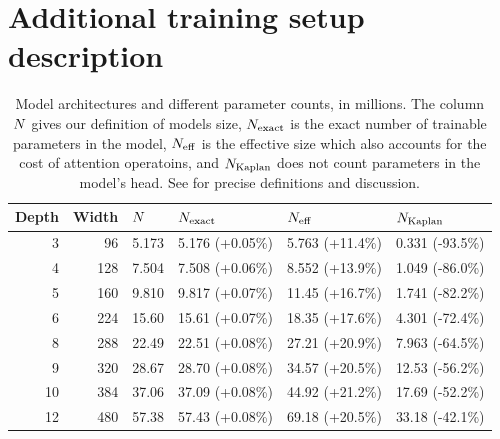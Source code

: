 \documentclass{article}
\theoremstyle{plain}
\theoremstyle{definition}
\theoremstyle{remark}
\newcommand{\maybeSubscript}[1]{
  \ifthenelse{\equal{#1}{}}{}{_{#1}}%
}
\newcommand{\params}[1][]{N\maybeSubscript{#1}}
\newcommand{\paramsEff}{\params_{\mathrm{eff}}}
\newcommand{\paramsKaplan}{\params_{\mathrm{Kaplan}}}
\newcommand{\paramsExact}{\params_{\mathrm{exact}}}
\begin{document}
\section{Additional training setup description}\label{app:training-setup}
\vspace{1em}
\begin{table}
    \caption{Model architectures and different parameter counts, in millions. The column $\params$ gives our definition of models size, $\paramsExact$ is the exact number of trainable parameters in the model, $\paramsEff$ is the effective size which also accounts for the cost of attention operatoins, and $\paramsKaplan$ does not count parameters in the model's head. See  for precise definitions and discussion.
    }
    \vspace{1em}
    \label{tab:model-archs}
    \centering
\renewcommand{\arraystretch}{1.15}
\begin{tabular}{rrllll}
\toprule
 Depth &  Width &     $\params$ &        $\paramsExact$ &           $\paramsEff$ &        $\paramsKaplan$ \\
\midrule
     \num{3} &     \num{96} & \num{5.173} & \num{5.176} \scriptsize{(+0.05\%)} & \num{5.763} \scriptsize{(+11.4\%)} & \num{0.331} \scriptsize{(-93.5\%)} \\
     \num{4} &    \num{128} & \num{7.504} & \num{7.508} \scriptsize{(+0.06\%)} & \num{8.552} \scriptsize{(+13.9\%)} & \num{1.049} \scriptsize{(-86.0\%)} \\
     \num{5} &    \num{160} & \num{9.810} & \num{9.817} \scriptsize{(+0.07\%)} & \num{11.45} \scriptsize{(+16.7\%)} & \num{1.741} \scriptsize{(-82.2\%)} \\
     \num{6} &    \num{224} & \num{15.60} & \num{15.61} \scriptsize{(+0.07\%)} & \num{18.35} \scriptsize{(+17.6\%)} & \num{4.301} \scriptsize{(-72.4\%)} \\
     \num{8} &    \num{288} & \num{22.49} & \num{22.51} \scriptsize{(+0.08\%)} & \num{27.21} \scriptsize{(+20.9\%)} & \num{7.963} \scriptsize{(-64.5\%)} \\
     \num{9} &    \num{320} & \num{28.67} & \num{28.70} \scriptsize{(+0.08\%)} & \num{34.57} \scriptsize{(+20.5\%)} & \num{12.53} \scriptsize{(-56.2\%)} \\
    \num{10} &    \num{384} & \num{37.06} & \num{37.09} \scriptsize{(+0.08\%)} & \num{44.92} \scriptsize{(+21.2\%)} & \num{17.69} \scriptsize{(-52.2\%)} \\
    \num{12} &    \num{480} & \num{57.38} & \num{57.43} \scriptsize{(+0.08\%)} & \num{69.18} \scriptsize{(+20.5\%)} & \num{33.18} \scriptsize{(-42.1\%)} \\

\end{tabular}
\end{table}
\end{document}
